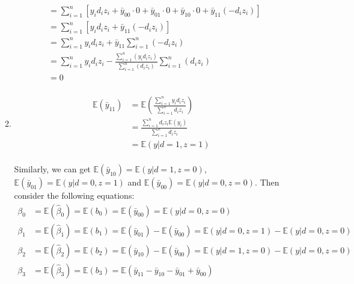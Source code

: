 \documentclass{article}
\begin{document}
\begin{enumerate}
\begin{enumerate}
\begin{equation}
\begin{aligned}
                &=\sum_{i=1}^{n}\left[y_id_iz_i+\bar{y}_{00}\cdot0+\bar{y}_{01}\cdot0+\bar{y}_{10}\cdot0+\bar{y}_{11}(-d_iz_i)\right] \\
                &=\sum_{i=1}^{n}[y_id_iz_i+\bar{y}_{11}(-d_iz_i)] \\
                &=\sum_{i=1}^{n}y_id_iz_i+\bar{y}_{11}\sum_{i=1}^{n}(-d_iz_i) \\
                &=\sum_{i=1}^{n}y_id_iz_i-\frac{\sum_{i=1}^{n}(y_id_iz_i)}{\sum_{i=1}^{n}(d_iz_i)}\sum_{i=1}^{n}(d_iz_i) \\
                &=0 \\
            \end{aligned}
            \nonumber
        \end{equation}
        \item \begin{equation}
            \begin{aligned}
                \mathbb{E}(\bar{y}_{11})
                &=\mathbb{E}\left(\frac{\sum_{i=1}^{n}y_id_iz_i}{\sum_{i=1}^{n}d_iz_i}\right) \\
                &=\frac{\sum_{i=1}^{n}d_iz_i\mathbb{E}(y_i)}{\sum_{i=1}^{n}d_iz_i} \\
                &=\mathbb{E}(y|d=1,z=1) \\
            \end{aligned}
            \nonumber
        \end{equation} \par
        Similarly, we can get $\mathbb{E}(\bar{y}_{10})=\mathbb{E}(y|d=1,z=0)$, $\mathbb{E}(\bar{y}_{01})=\mathbb{E}(y|d=0,z=1)$ and $\mathbb{E}(\bar{y}_{00})=\mathbb{E}(y|d=0,z=0)$.
        Then consider the following equations:
        \begin{equation}
            \begin{aligned}
                \beta_0&=\mathbb{E}(\hat{\beta}_0)=\mathbb{E}(b_0)=\mathbb{E}(\bar{y}_{00})=\mathbb{E}(y|d=0,z=0) \\
                \beta_1&=\mathbb{E}(\hat{\beta}_1)=\mathbb{E}(b_1)=\mathbb{E}(\bar{y}_{01})-\mathbb{E}(\bar{y}_{00})=\mathbb{E}(y|d=0,z=1)-\mathbb{E}(y|d=0,z=0) \\
                \beta_2&=\mathbb{E}(\hat{\beta}_2)=\mathbb{E}(b_2)=\mathbb{E}(\bar{y}_{10})-\mathbb{E}(\bar{y}_{00})=\mathbb{E}(y|d=1,z=0)-\mathbb{E}(y|d=0,z=0) \\
                \beta_3&=\mathbb{E}(\hat{\beta}_3)=\mathbb{E}(b_3)=\mathbb{E}(\bar{y}_{11}-\bar{y}_{10}-\bar{y}_{01}+\bar{y}_{00}) \\

\end{aligned}
\end{equation}
\end{enumerate}
\end{enumerate}
\end{document}
